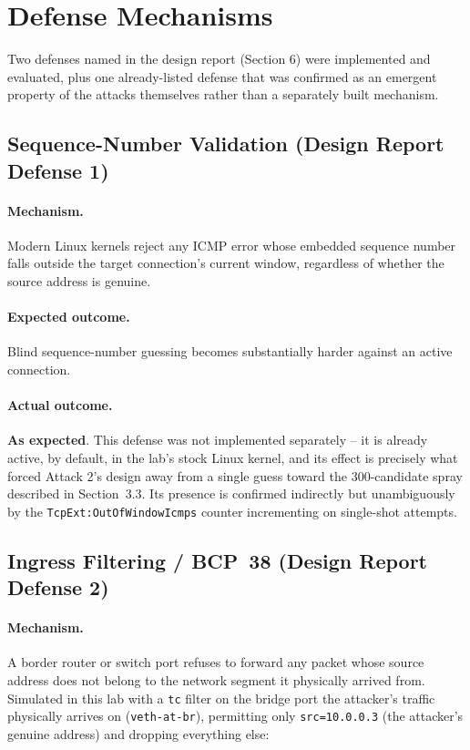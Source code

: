 \documentclass[11pt]{article}
\newcommand{\worked}{\textcolor{green!50!black}{\textbf{As expected}}}
\begin{document}
\section{Defense Mechanisms}

Two defenses named in the design report (Section 6) were implemented
and evaluated, plus one already-listed defense that was confirmed as an
emergent property of the attacks themselves rather than a separately
built mechanism.

\subsection{Sequence-Number Validation (Design Report Defense 1)}

\paragraph{Mechanism.} Modern Linux kernels reject any ICMP error whose
embedded sequence number falls outside the target connection's current
window, regardless of whether the source address is genuine.

\paragraph{Expected outcome.} Blind sequence-number guessing becomes
substantially harder against an active connection.

\paragraph{Actual outcome.} \worked. This defense was not implemented
separately -- it is already active, by default, in the lab's stock
Linux kernel, and its effect is precisely what forced Attack 2's design
away from a single guess toward the 300-candidate spray described in
Section~3.3. Its presence is confirmed indirectly but unambiguously by
the \texttt{TcpExt:OutOfWindowIcmps} counter incrementing on single-shot
attempts.

\subsection{Ingress Filtering / BCP~38 (Design Report Defense 2)}

\paragraph{Mechanism.} A border router or switch port refuses to
forward any packet whose source address does not belong to the network
segment it physically arrived from. Simulated in this lab with a
\texttt{tc} filter on the bridge port the attacker's traffic physically
arrives on (\texttt{veth-at-br}), permitting only
\texttt{src=10.0.0.3} (the attacker's genuine address) and dropping
everything else:
\end{document}
